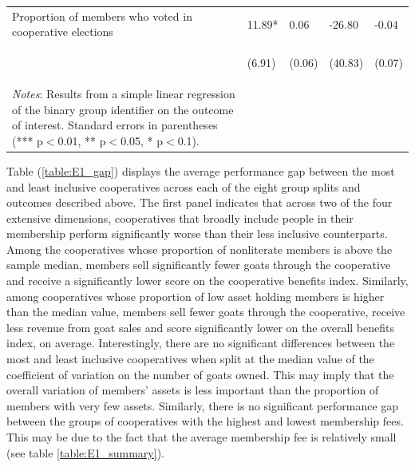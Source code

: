 \documentclass[11pt]{article}
\begin{document}
\begin{table}[H]
{\begin{tabularx}{1.5\linewidth}{lllll}
\noalign{\smallskip}Proportion of members who voted in cooperative elections & 11.89* & 0.06 & -26.80 & -0.04\\
 & \begin{footnotesize}(6.91)\end{footnotesize} & \begin{footnotesize}(0.06)\end{footnotesize} & \begin{footnotesize}(40.83)\end{footnotesize} & \begin{footnotesize}(0.07)\end{footnotesize}\\
\noalign{\smallskip}\hline
\multicolumn{5}{@{}p{1.5\linewidth}}
{\textit{Notes}: Results from a simple linear regression of the binary group identifier on the outcome of interest. Standard errors in parentheses (*** p$<$0.01, ** p$<$0.05, * p$<$0.1). }
  \end{tabularx}}
\end{table}
\doublespacing

Table (\ref{table:E1_gap}) displays the average performance gap between the most and least inclusive cooperatives across each of the eight group splits and outcomes described above. The first panel indicates that across two of the four extensive dimensions, cooperatives that broadly include people in their membership perform significantly worse than their less inclusive counterparts. Among the cooperatives whose proportion of nonliterate members is above the sample median, members sell significantly fewer goats through the cooperative and receive a significantly lower score on the cooperative benefits index. Similarly, among cooperatives whose proportion of low asset holding members is higher than the median value, members sell fewer goats through the cooperative, receive less revenue from goat sales and score significantly lower on the overall benefits index, on average. Interestingly, there are no significant differences between the most and least inclusive cooperatives when split at the median value of the coefficient of variation on the number of goats owned. This may imply that the overall variation of members' assets is less important than the proportion of members with very few assets. Similarly, there is no significant performance gap between the groups of cooperatives with the highest and lowest membership fees. This may be due to the fact that the average membership fee is relatively small (see table \ref{table:E1_summary}). 
\end{document}
